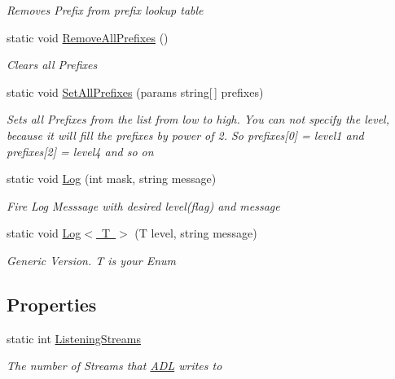 \begin{DoxyCompactItemize}
\begin{DoxyCompactList}\small\item\em Removes Prefix from prefix lookup table \end{DoxyCompactList}\item 
static void \mbox{\hyperlink{class_a_d_l_1_1_debug_a55a298962d5f05d55c5b3b045e7f6fe7}{Remove\+All\+Prefixes}} ()
\begin{DoxyCompactList}\small\item\em Clears all Prefixes \end{DoxyCompactList}\item 
static void \mbox{\hyperlink{class_a_d_l_1_1_debug_aeee052b6bc6759222ce6ed32dd9763a1}{Set\+All\+Prefixes}} (params string\mbox{[}$\,$\mbox{]} prefixes)
\begin{DoxyCompactList}\small\item\em Sets all Prefixes from the list from low to high. You can not specify the level, because it will fill the prefixes by power of 2. So prefixes\mbox{[}0\mbox{]} = level1 and prefixes\mbox{[}2\mbox{]} = level4 and so on \end{DoxyCompactList}\item 
static void \mbox{\hyperlink{class_a_d_l_1_1_debug_a169452dbed965a360a23e112ed9956c3}{Log}} (int mask, string message)
\begin{DoxyCompactList}\small\item\em Fire Log Messsage with desired level(flag) and message \end{DoxyCompactList}\item 
static void \mbox{\hyperlink{class_a_d_l_1_1_debug_a4162ccb62b2facbc5ab9f981abe6fa3e}{Log$<$ T $>$}} (T level, string message)
\begin{DoxyCompactList}\small\item\em Generic Version. T is your Enum \end{DoxyCompactList}\end{DoxyCompactItemize}
\subsection*{Properties}
\begin{DoxyCompactItemize}
\item 
static int \mbox{\hyperlink{class_a_d_l_1_1_debug_aaa46716e2c6ca9520b6b132efdb0abd2}{Listening\+Streams}}
\begin{DoxyCompactList}\small\item\em The number of Streams that \mbox{\hyperlink{namespace_a_d_l}{A\+DL}} writes to \end{DoxyCompactList}\end{DoxyCompactItemize}


